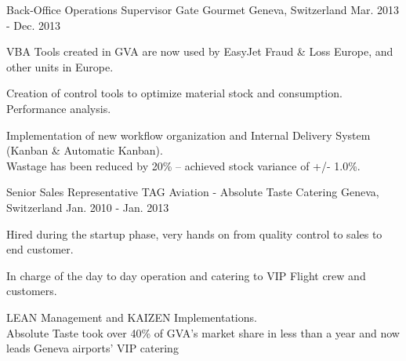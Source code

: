 \begin{cventries}

\cventry
{Back-Office Operations Supervisor} %
{Gate Gourmet} %
{Geneva, Switzerland} %
{Mar. 2013 - Dec. 2013} %
{ %
\begin{cvitems}
\item {VBA Tools created in GVA are now used by EasyJet Fraud \& Loss Europe, and other units in Europe.}
\item {Creation of control tools to optimize material stock and consumption. Performance analysis.}
\item {Implementation of new workflow organization and Internal Delivery System (Kanban \& Automatic Kanban).}
\\
\center\colorbox{mygray}{Wastage has been reduced by 20\% – achieved stock variance of +/- 1.0\%.}
\end{cvitems} 
}


\cventry
{Senior Sales Representative} %
{TAG Aviation - Absolute Taste Catering} %
{Geneva, Switzerland} %
{Jan. 2010 - Jan. 2013} %
{ %
\begin{cvitems}
\item {Hired during the startup phase, very hands on from quality control to sales to end customer.}
\item {In charge of the day to day operation and catering to VIP Flight crew and customers.}
\item {LEAN Management and KAIZEN Implementations.} 
\\
\center\colorbox{mygray}{Absolute Taste took over 40\% of GVA’s market share in less than a year and now leads Geneva airports’ VIP catering}
\end{cvitems}
}


\end{cventries}
